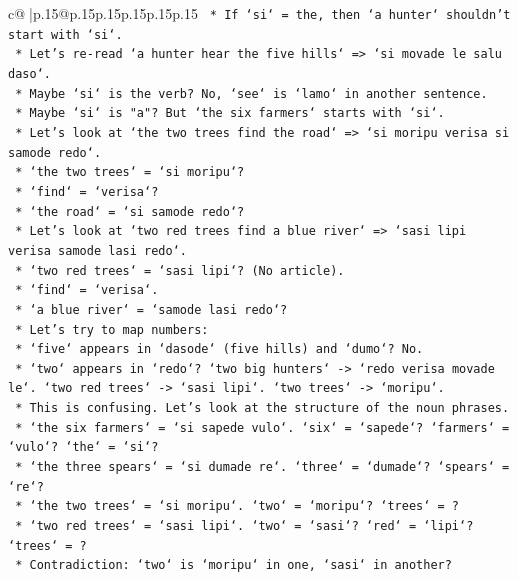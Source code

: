 \documentclass{article}
\begin{document}
{\begin{supertabular}{c@{$\;$}|p{.15\linewidth}@{}p{.15\linewidth}p{.15\linewidth}p{.15\linewidth}p{.15\linewidth}p{.15\linewidth}}
{{{\texttt{        *   If `si` = the, then `a hunter` shouldn't start with `si`.} \\
\texttt{        *   Let's re{-}read `a hunter hear the five hills` => `si movade le salu daso`.} \\
\texttt{        *   Maybe `si` is the verb? No, `see` is `lamo` in another sentence.} \\
\texttt{        *   Maybe `si` is "a"? But `the six farmers` starts with `si`.} \\
\texttt{        *   Let's look at `the two trees find the road` => `si moripu verisa si samode redo`.} \\
\texttt{            *   `the two trees` = `si moripu`?} \\
\texttt{            *   `find` = `verisa`?} \\
\texttt{            *   `the road` = `si samode redo`?} \\
\texttt{        *   Let's look at `two red trees find a blue river` => `sasi lipi verisa samode lasi redo`.} \\
\texttt{            *   `two red trees` = `sasi lipi`? (No article).} \\
\texttt{            *   `find` = `verisa`.} \\
\texttt{            *   `a blue river` = `samode lasi redo`?} \\
\texttt{    *   Let's try to map numbers:} \\
\texttt{        *   `five` appears in `dasode` (five hills) and `dumo`? No.} \\
\texttt{        *   `two` appears in `redo`? `two big hunters` {-}> `redo verisa movade le`. `two red trees` {-}> `sasi lipi`. `two trees` {-}> `moripu`.} \\
\texttt{        *   This is confusing. Let's look at the structure of the noun phrases.} \\
\texttt{        *   `the six farmers` = `si sapede vulo`. `six` = `sapede`? `farmers` = `vulo`? `the` = `si`?} \\
\texttt{        *   `the three spears` = `si dumade re`. `three` = `dumade`? `spears` = `re`?} \\
\texttt{        *   `the two trees` = `si moripu`. `two` = `moripu`? `trees` = ?} \\
\texttt{        *   `two red trees` = `sasi lipi`. `two` = `sasi`? `red` = `lipi`? `trees` = ?} \\
\texttt{        *   Contradiction: `two` is `moripu` in one, `sasi` in another?} \\
}}}
\end{supertabular}}
\end{document}
